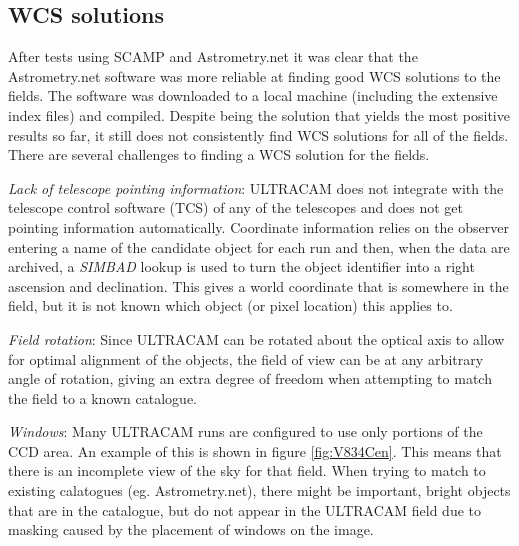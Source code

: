 
\subsection{WCS solutions}\label{sect:astrometry}

After tests using SCAMP \citep{scamp} and Astrometry.net \citep{astrometry} it was clear that the Astrometry.net software was more reliable at finding good WCS solutions to the fields. The software was downloaded to a local machine (including the extensive index files) and compiled. Despite being the solution that yields the most positive results so far, it still does not consistently find WCS solutions for all of the fields. There are several challenges to finding a WCS solution for the fields.

\emph{Lack of telescope pointing information}: ULTRACAM does not integrate with the telescope control software (TCS) of any of the telescopes and does not get pointing information automatically. Coordinate information relies on the observer entering a name of the candidate object for each run and then, when the data are archived, a \emph{SIMBAD} lookup is used to turn the object identifier into a right ascension and declination. This gives a world coordinate that is somewhere in the field, but it is not known which object (or pixel location) this applies to.  

\emph{Field rotation}: Since ULTRACAM can be rotated about the optical axis to allow for optimal alignment of the objects, the field of view can be at any arbitrary angle of rotation, giving an extra degree of freedom when attempting to match the field to a known catalogue. 

\emph{Windows}: Many ULTRACAM runs are configured to use only portions of the CCD area. An example of this is shown in figure \ref{fig:V834Cen}. This means that there is an incomplete view of the sky for that field. When trying to match to existing calatogues (eg. Astrometry.net), there might be important, bright objects that are in the catalogue, but do not appear in the ULTRACAM field due to masking caused by the placement of windows on the image.

